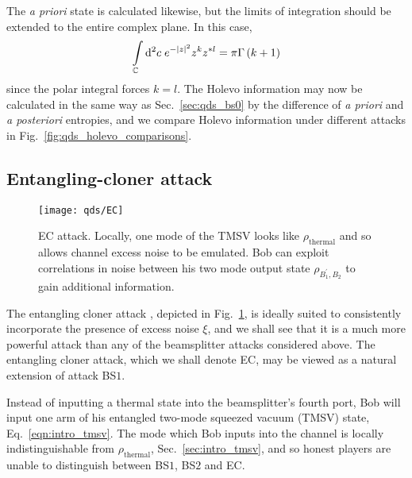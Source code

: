 The \emph{a priori} state is calculated likewise, but the limits of integration should be extended to the entire complex plane. In this case,
\begin{equation}\label{eqn:qds_bs1_deriv_4}
\int\limits_{\mathbb{C}} \mathop{}\!\mathrm{d^2} c \; e^{-\left|z\right|^2}z^k z^{* l} = \pi \Gamma\left(k+1\right)
\end{equation}
since the polar integral forces $k=l$. The Holevo information may now be calculated in the same way as Sec.~\ref{sec:qds_bs0} by the difference of \emph{a priori} and \emph{a posteriori} entropies, and we compare Holevo information under different attacks in Fig.~\ref{fig:qds_holevo_comparisons}.



\subsection{Entangling-cloner attack}
\begin{figure}[htp]
\centering
\texttt{[image: qds/EC]}
\caption{\label{fig:ec_attack} EC attack. Locally, one mode of the TMSV looks like $\rho_{\text{thermal}}$ and so allows channel excess noise to be emulated. Bob can exploit correlations in noise between his two mode output state $\rho_{B_1^\prime, B_2}$ to gain additional information.}
\end{figure}
The entangling cloner attack \cite{Grosshans2002, Grosshans2003}, depicted in Fig.~\ref{fig:ec_attack}, is ideally suited to consistently incorporate the presence of excess noise $\xi$, and we shall see that it is a much more powerful attack than any of the beamsplitter attacks considered above. The entangling cloner attack, which we shall denote EC, may be viewed as a natural extension of attack BS$1$.  %

Instead of inputting a thermal state into the beamsplitter's fourth port, Bob will input one arm of his entangled two-mode squeezed vacuum (TMSV) state, Eq.~\ref{eqn:intro_tmsv}. The mode which Bob inputs into the channel is locally indistinguishable from $\rho_{\text{thermal}}$, Sec.~\ref{sec:intro_tmsv}, and so honest players are unable to distinguish between BS$1$, BS$2$ and EC.



